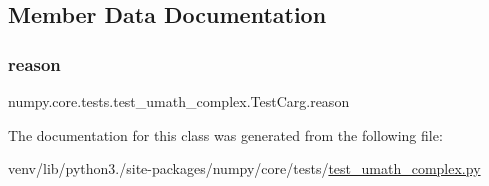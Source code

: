 \subsection{Member Data Documentation}
\mbox{\label{classnumpy_1_1core_1_1tests_1_1test__umath__complex_1_1TestCarg_ade1e765c5b82301887fe1bdb80f7a9f8}} 
\subsubsection{\texorpdfstring{reason}{reason}}
{\footnotesize\ttfamily numpy.\+core.\+tests.\+test\+\_\+umath\+\_\+complex.\+Test\+Carg.\+reason\hspace{0.3cm}{\ttfamily [static]}}



The documentation for this class was generated from the following file\+:\begin{DoxyCompactItemize}
\item 
venv/lib/python3./site-\/packages/numpy/core/tests/\hyperlink{test__umath__complex_8py}{test\+\_\+umath\+\_\+complex.\+py}\end{DoxyCompactItemize}
